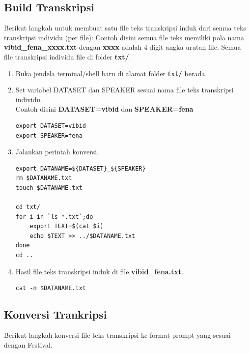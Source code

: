 \documentclass[12pt,]{article}
\begin{document}
	\subsection{Build Transkripsi}
	
	Berikut langkah untuk membuat satu file teks transkripsi induk dari semua teks transkripsi individu (per file):
	Contoh disini semua file teks memiliki pola nama \textbf{vibid\_fena\_xxxx.txt} dengan \textbf{xxxx} adalah 4 digit angka urutan file.
	Semua file transkripsi individu file di folder \textbf{txt/}.
	
	\begin{enumerate}
		\item Buka jendela terminal/shell baru di alamat folder \textbf{txt/} berada.
		
		\newpage
		\item Set variabel DATASET dan SPEAKER sesuai nama file teks transkripsi individu.\\
		Contoh disini \textbf{DATASET=vibid} dan \textbf{SPEAKER=fena}
		\begin{verbatim}
export DATASET=vibid
export SPEAKER=fena
		\end{verbatim}
		
		\item Jalankan perintah konversi.
		\begin{verbatim}
export DATANAME=${DATASET}_${SPEAKER}
rm $DATANAME.txt
touch $DATANAME.txt

cd txt/
for i in `ls *.txt`;do
	export TEXT=$(cat $i)
	echo $TEXT >> ../$DATANAME.txt
done
cd ..
		\end{verbatim}
		
		\item Hasil file teks transkripsi induk di file \textbf{vibid\_fena.txt}.
		\begin{verbatim}
cat -n $DATANAME.txt
		\end{verbatim}
		
	\end{enumerate}
	
	\newpage
	\subsection{Konversi Trankripsi}
	
	Berikut langkah konversi file teks transkripsi ke format prompt yang sesuai dengan Festival.
	
\end{document}
